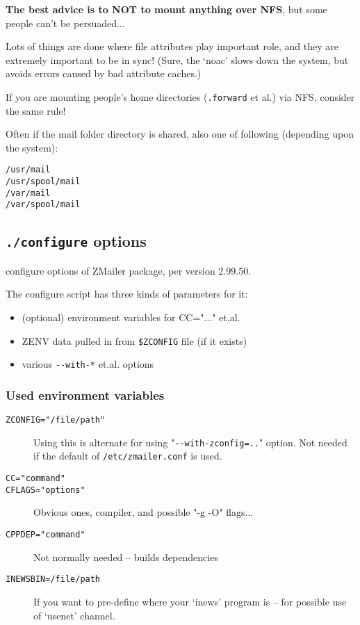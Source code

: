 {\bf The best advice is to NOT to mount anything over NFS},
but some people can't be persuaded...

Lots of things are done where file attributes play important
role, and they are extremely important to be in sync!
(Sure, the `noac' slows down the system, but avoids errors
caused by bad attribute caches.)

If you are mounting people's home directories ({\tt .forward} et al.)
via NFS, consider the same rule!

Often if the mail folder directory is shared, also
one of following (depending upon the system):
\begin{alltt}
    /usr/mail
    /usr/spool/mail
    /var/mail
    /var/spool/mail
\end{alltt}


\subsection{{\tt ./configure} options}%
%
%
\label{configure_options_list}

configure  options of ZMailer package, per version 2.99.50.


The  configure  script has three kinds of parameters for it:
\begin{itemize}
\item (optional) environment variables for CC="..." et.al.
\item ZENV data pulled in from {\tt \$ZCONFIG} file (if it exists)
\item various  \verb/--with-*/  et.al. options
\end{itemize}


\subsubsection{Used environment variables}

\begin{description}
\item[\tt ZCONFIG="/file/path"] \mbox{}

Using this is alternate for using "\verb/--with-zconfig=../" option.
Not needed if the default of {\tt /etc/zmailer.conf} is used.

\item[\tt CC="command"]
\item[\tt CFLAGS="options"] \mbox{}

Obvious ones, compiler, and possible "-g -O" flags...

\item[\tt CPPDEP="command"] \mbox{}

Not normally needed -- builds dependencies

\item[\tt INEWSBIN=/file/path] \mbox{}

If you want to pre-define where your `inews' program
is -- for possible use of `usenet' channel.
\end{description}

